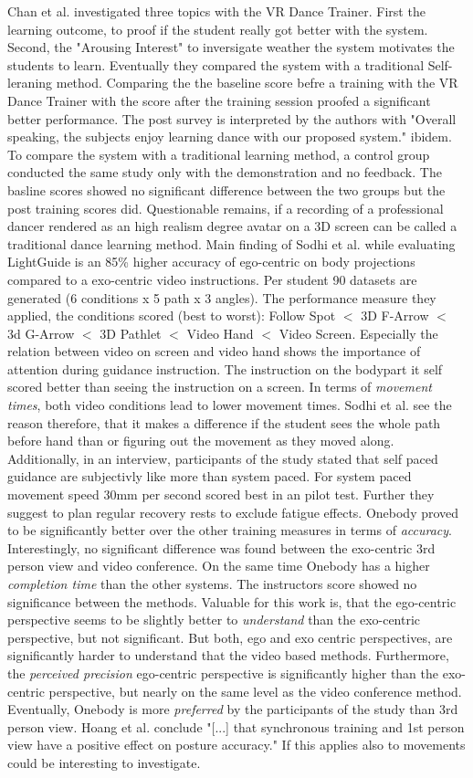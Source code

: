 Chan et al. investigated three topics with the VR Dance Trainer. First the learning outcome, to proof if the student really got better with the system. Second, the "Arousing Interest" to inversigate weather the system motivates the students to learn. Eventually they compared the system with a traditional Self-leraning method. Comparing the the baseline score befre a training with the VR Dance Trainer with the score after the training session proofed a significant better performance. The post survey is interpreted by the authors with "Overall speaking, the subjects enjoy learning dance with our proposed system." ibidem. To compare the system with a traditional learning method, a control group conducted the same study only with the demonstration and no feedback. The basline scores showed no significant difference between the two groups but the post training scores did. Questionable remains, if a recording of a professional dancer rendered as an high realism degree avatar on a 3D screen can be called a traditional dance learning method.
Main finding of Sodhi et al. while evaluating LightGuide is an 85\% higher accuracy of ego-centric on body projections compared to a exo-centric video instructions.
Per student 90 datasets are generated (6 conditions x 5 path x 3 angles). The performance measure they applied, the conditions scored (best to worst): Follow Spot $<$ 3D F-Arrow $<$ 3d G-Arrow $<$ 3D Pathlet $<$ Video Hand $<$ Video Screen. Especially the relation between video on screen and video hand shows the importance of attention during guidance instruction. The instruction on the bodypart it self scored better than seeing the instruction on a screen. In terms of \textit{movement times}, both video conditions lead to lower movement times. Sodhi et al. see the reason therefore, that it makes a difference if the student sees the whole path before hand than or figuring out the movement as they moved along. Additionally, in an interview, participants of the study stated that self paced guidance are subjectivly like more than system paced. For system paced movement speed 30mm per second scored best in an pilot test. Further they suggest to plan regular recovery rests to exclude fatigue effects.
Onebody \cite{Hoang2016} proved to be significantly better over the other training measures in terms of \textit{accuracy}. Interestingly, no significant difference was found between the exo-centric 3rd person view and video conference. On the same time Onebody has a higher \textit{completion time} than the other systems. The instructors score showed no significance between the methods. Valuable for this work is, that the ego-centric perspective seems to be slightly better to \textit{understand} than the exo-centric perspective, but not significant. But both, ego and exo centric perspectives, are significantly harder to understand that the video based methods. Furthermore, the \textit{perceived precision} ego-centric perspective is significantly higher than the exo-centric perspective, but nearly on the same level as the video conference method. Eventually, Onebody is more \textit{preferred} by the participants of the study than 3rd person view. Hoang et al. conclude "[...] that synchronous training and 1st person view have a positive effect on posture accuracy." If this applies also to movements could be interesting to investigate.
